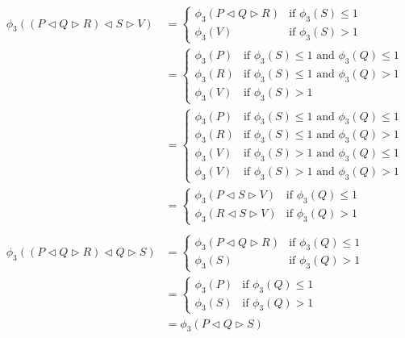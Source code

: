 \documentclass[a4paper,twoside,openright]{report}
\newcommand{\lef}{\ensuremath{\triangleleft}}
\newcommand{\rig}{\ensuremath{\triangleright}}
\begin{document}
\begin{align*}
\phi_3((P\lef Q\rig R)\lef S\rig V)
&=\begin{cases}
\phi_3(P\lef Q\rig R) & \text{if $\phi_3(S)\le 1$}\\
\phi_3(V) & \text{if $\phi_3(S)>1$}
\end{cases}\\
&=\begin{cases}
\phi_3(P) & \text{if $\phi_3(S)\le 1$ and $\phi_3(Q)\le 1$}\\
\phi_3(R) & \text{if $\phi_3(S)\le 1$ and $\phi_3(Q)>1$}\\
\phi_3(V) & \text{if $\phi_3(S)>1$}
\end{cases}\\
&=\begin{cases}
\phi_3(P) & \text{if $\phi_3(S)\le 1$ and $\phi_3(Q)\le 1$}\\
\phi_3(R) & \text{if $\phi_3(S)\le 1$ and $\phi_3(Q)>1$}\\
\phi_3(V) & \text{if $\phi_3(S)>1$ and $\phi_3(Q)\le 1$}\\
\phi_3(V) & \text{if $\phi_3(S)>1$ and $\phi_3(Q)>1$}
\end{cases}\\
&=\begin{cases}
\phi_3(P\lef S\rig V) & \text{if $\phi_3(Q)\le 1$}\\
\phi_3(R\lef S\rig V) & \text{if $\phi_3(Q)>1$}
\end{cases}\\\\
\phi_3((P\lef Q\rig R)\lef Q\rig S)
&=\begin{cases}
\phi_3(P\lef Q\rig R) & \text{if $\phi_3(Q)\le 1$}\\
\phi_3(S) & \text{if $\phi_3(Q)>1$}
\end{cases}\\
&=\begin{cases}
\phi_3(P) & \text{if $\phi_3(Q)\le 1$}\\
\phi_3(S) & \text{if $\phi_3(Q)>1$}
\end{cases}\\
&=\phi_3(P\lef Q\rig S)
\end{align*}
\end{document}
